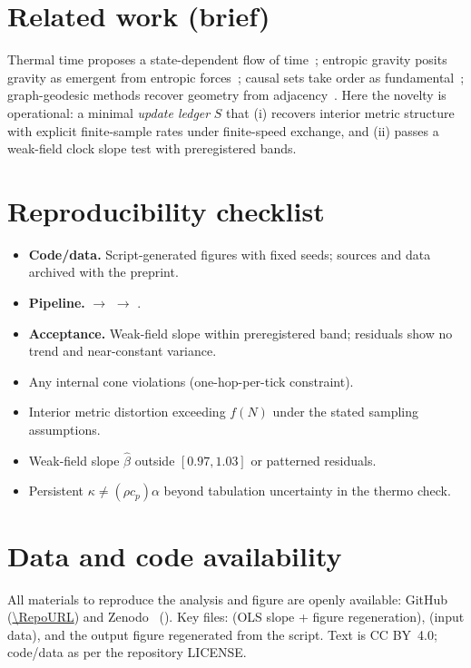 \documentclass[11pt,a4paper]{article}
\begin{document}
\section*{Related work (brief)}
Thermal time proposes a state-dependent flow of time~\cite{Rovelli1993,Rovelli2011}; entropic gravity posits gravity as emergent from entropic forces~\cite{Verlinde2011}; causal sets take order as fundamental~\cite{Bombelli1987}; graph-geodesic methods recover geometry from adjacency~\cite{Tenenbaum2000}. Here the novelty is operational: a minimal \emph{update ledger} $S$ that (i) recovers interior metric structure with explicit finite-sample rates under finite-speed exchange, and (ii) passes a weak-field clock slope test with preregistered bands.

\section*{Reproducibility checklist}
\begin{itemize}
  \item \textbf{Code/data.} Script-generated figures with fixed seeds; sources and data archived with the preprint.
  \item \textbf{Pipeline.}  $\rightarrow$  $\rightarrow$ .
  \item \textbf{Acceptance.} Weak-field slope within preregistered band; residuals show no trend and near-constant variance.
\end{itemize}

\begin{tcolorbox}[title=Falsifiers (pre-registered)]
\begin{itemize}
  \item Any internal cone violations (one-hop-per-tick constraint).
  \item Interior metric distortion exceeding $f(N)$ under the stated sampling assumptions.
  \item Weak-field slope $\hat\beta$ outside $[0.97,1.03]$ or patterned residuals.
  \item Persistent $\kappa \neq (\rho c_p)\alpha$ beyond tabulation uncertainty in the thermo check.
\end{itemize}
\end{tcolorbox}

\section*{Data and code availability}
All materials to reproduce the analysis and figure are openly available:
GitHub (\url{\RepoURL}) and Zenodo \PaperVersion\ (\RepoDOIlink). Key files:
 (OLS slope + figure regeneration),
 (input data), and the output figure
 regenerated from the script.
Text is CC BY~4.0; code/data as per the repository LICENSE.
\end{document}
